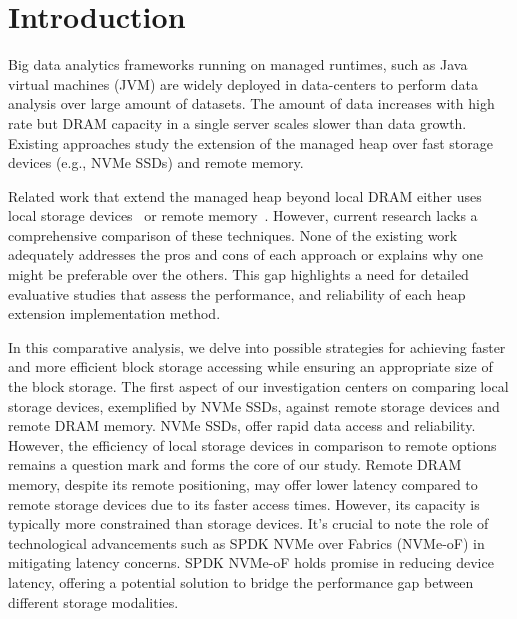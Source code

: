 \section{Introduction}
Big data analytics frameworks running on managed runtimes, such as Java virtual
machines (JVM) are widely deployed in data-centers to perform data analysis over
large amount of datasets. The amount of data increases with high rate but DRAM
capacity in a single server scales slower than data growth. Existing approaches
study the extension of the managed heap over fast storage devices (e.g., NVMe
SSDs) and remote memory.


Related work that extend the managed heap beyond local DRAM either uses local storage devices~\cite{XXX} or remote memory~\cite{XXXX}. However, current
research lacks a comprehensive comparison of these techniques. None of the
existing work adequately addresses the pros and cons of each approach or
explains why one might be preferable over the others. This gap highlights a need
for detailed evaluative studies that assess the performance, and reliability of
each heap extension implementation method.



In this comparative analysis, we delve into possible strategies for achieving
faster and more efficient block storage accessing while ensuring an appropriate
size of the block storage. The first aspect of our investigation centers on
comparing local storage devices, exemplified by NVMe SSDs, against remote
storage devices and remote DRAM memory. NVMe SSDs, offer rapid data access and
reliability. However, the efficiency of local storage devices in comparison to
remote options remains a question mark and forms the core of our study. Remote
DRAM memory, despite its remote positioning, may offer lower latency compared to
remote storage devices due to its faster access times. However, its capacity is
typically more constrained than storage devices. It's crucial to note the role
of technological advancements such as SPDK NVMe over Fabrics (NVMe-oF) in
mitigating latency concerns. SPDK NVMe-oF holds promise in reducing device
latency, offering a potential solution to bridge the performance gap between
different storage modalities. 


